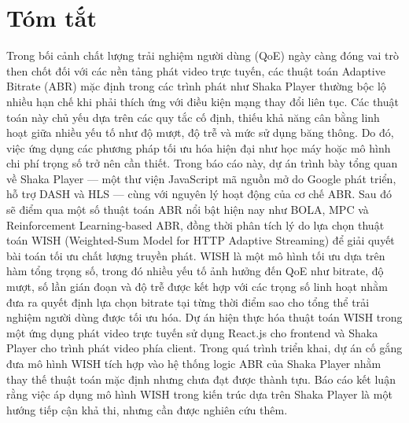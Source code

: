 \documentclass[12pt]{report}
\begin{document}



\chapter*{Tóm tắt}
Trong bối cảnh chất lượng trải nghiệm người dùng (QoE) ngày càng đóng vai trò then chốt đối với các nền tảng phát video trực tuyến, các thuật toán Adaptive Bitrate (ABR) mặc định trong các trình phát như Shaka Player thường bộc lộ nhiều hạn chế khi phải thích ứng với điều kiện mạng thay đổi liên tục. Các thuật toán này chủ yếu dựa trên các quy tắc cố định, thiếu khả năng cân bằng linh hoạt giữa nhiều yếu tố như độ mượt, độ trễ và mức sử dụng băng thông. Do đó, việc ứng dụng các phương pháp tối ưu hóa hiện đại như học máy hoặc mô hình chi phí trọng số trở nên cần thiết. Trong báo cáo này, dự án trình bày tổng quan về Shaka Player — một thư viện JavaScript mã nguồn mở do Google phát triển, hỗ trợ DASH và HLS — cùng với nguyên lý hoạt động của cơ chế ABR. Sau đó sẽ điểm qua một số thuật toán ABR nổi bật hiện nay như BOLA, MPC và Reinforcement Learning-based ABR, đồng thời phân tích lý do lựa chọn thuật toán WISH (Weighted-Sum Model for HTTP Adaptive Streaming) để giải quyết bài toán tối ưu chất lượng truyền phát. WISH là một mô hình tối ưu dựa trên hàm tổng trọng số, trong đó nhiều yếu tố ảnh hưởng đến QoE như bitrate, độ mượt, số lần gián đoạn và độ trễ được kết hợp với các trọng số linh hoạt nhằm đưa ra quyết định lựa chọn bitrate tại từng thời điểm sao cho tổng thể trải nghiệm người dùng được tối ưu hóa. Dự án hiện thực hóa thuật toán WISH trong một ứng dụng phát video trực tuyến sử dụng React.js cho frontend và Shaka Player cho trình phát video phía client. Trong quá trình triển khai, dự án cố gắng đưa mô hình WISH tích hợp vào hệ thống logic ABR của Shaka Player nhằm thay thế thuật toán mặc định nhưng chưa đạt được thành tựu. Báo cáo kết luận rằng việc áp dụng mô hình WISH trong kiến trúc dựa trên Shaka Player là một hướng tiếp cận khả thi, nhưng cần được nghiên cứu thêm.
\end{document}

